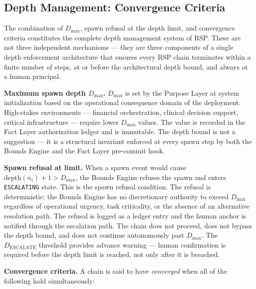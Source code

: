 \subsection{Depth Management: Convergence Criteria}
\label{sec:rs-depth-management}

The combination of $D_{\max}$, spawn refusal at the depth limit, and convergence criteria constitutes the complete depth management system of RSP. These are not three independent mechanisms — they are three components of a single depth enforcement architecture that ensures every RSP chain terminates within a finite number of steps, at or before the architectural depth bound, and always at a human principal.

\medskip
\noindent\textbf{Maximum spawn depth $D_{\max}$.} $D_{\max}$ is set by the Purpose Layer at system initialization based on the operational consequence domain of the deployment. High-stakes environments — financial orchestration, clinical decision support, critical infrastructure — require lower $D_{\max}$ values. The value is recorded in the Fact Layer authorization ledger and is immutable. The depth bound is not a suggestion — it is a structural invariant enforced at every spawn step by both the Bounds Engine and the Fact Layer pre-commit hook.

\medskip
\noindent\textbf{Spawn refusal at limit.} When a spawn event would cause $\text{depth}(n_i) + 1 > D_{\max}$, the Bounds Engine refuses the spawn and enters \texttt{ESCALATING} state. This is the spawn refusal condition. The refusal is deterministic: the Bounds Engine has no discretionary authority to exceed $D_{\max}$ regardless of operational urgency, task criticality, or the absence of an alternative resolution path. The refusal is logged as a ledger entry and the human anchor is notified through the escalation path. The chain does not proceed, does not bypass the depth bound, and does not continue autonomously past $D_{\max}$. The $D_{\text{ESCALATE}}$ threshold provides advance warning — human confirmation is required before the depth limit is reached, not only after it is breached.

\medskip
\noindent\textbf{Convergence criteria.} A chain is said to have \emph{converged} when all of the following hold simultaneously:

